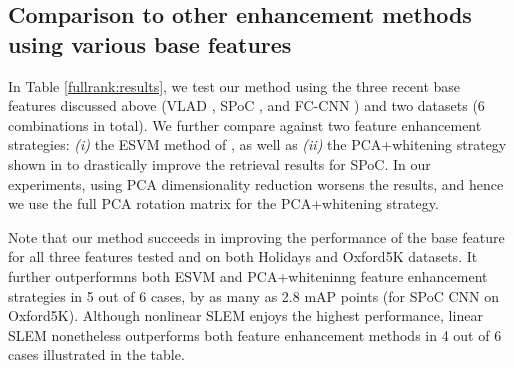 \subsection{Comparison to other enhancement methods using various base features} 
In Table \ref{fullrank:results}, we test our method using the three recent base features discussed above (VLAD \cite{Delhumeau2013}, SPoC \cite{babenko15}, and FC-CNN \cite{Sharif}) and two datasets (6 combinations in total). We further compare against two feature enhancement strategies: {\it (i)} the ESVM method of \cite{ZePe15}, as well as {\it (ii)} the PCA+whitening strategy shown in \cite{babenko15} to drastically improve the retrieval results for SPoC. In our experiments, using PCA dimensionality reduction worsens the results, and hence we use the full PCA rotation matrix for the PCA+whitening strategy.

Note that our method succeeds in improving the performance of the base feature for all three features tested and on both Holidays and Oxford5K datasets. It further outperformns both ESVM and PCA+whiteninng feature enhancement strategies in 5 out of 6 cases, by as many as 2.8 mAP points (for SPoC CNN on Oxford5K). Although nonlinear SLEM enjoys the highest performance, linear SLEM nonetheless outperforms both feature enhancement methods in 4 out of 6 cases illustrated in the table.


